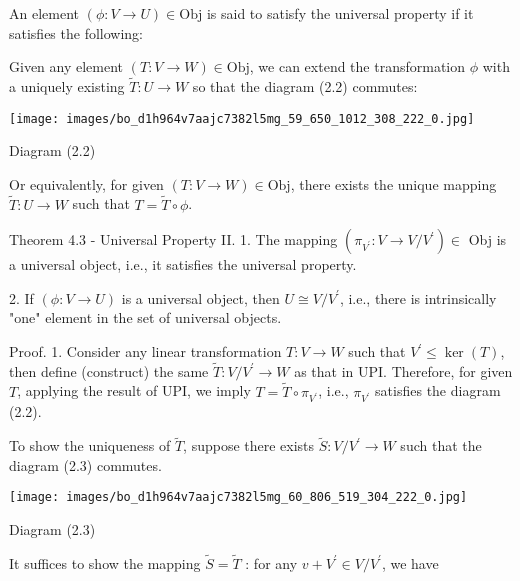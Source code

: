 \documentclass[11pt]{article}
\begin{document}
An element \(\left( {\phi  : V \rightarrow  U}\right)  \in  \mathrm{{Obj}}\) is said to satisfy the universal property if it satisfies the following:

Given any element \(\left( {T : V \rightarrow  W}\right)  \in  \mathrm{{Obj}}\), we can extend the transformation \(\phi\) with a uniquely existing \(\widetilde{T} : U \rightarrow  W\) so that the diagram (2.2) commutes:

\begin{center}
\texttt{[image: images/bo\_d1h964v7aajc7382l5mg\_59\_650\_1012\_308\_222\_0.jpg]}
\end{center}
\hspace*{3em} 

Diagram (2.2)

Or equivalently, for given \(\left( {T : V \rightarrow  W}\right)  \in  \mathrm{{Obj}}\), there exists the unique mapping \(\widetilde{T} : U \rightarrow  W\) such that \(T = \widetilde{T} \circ  \phi\).

Theorem 4.3 - Universal Property II. 1. The mapping \(\left( {{\pi }_{{V}^{\prime }} : V \rightarrow  V/{V}^{\prime }}\right)  \in\) Obj is a universal object, i.e., it satisfies the universal property.

2. If \(\left( {\phi  : V \rightarrow  U}\right)\) is a universal object, then \(U \cong  V/{V}^{\prime }\), i.e., there is intrinsically "one" element in the set of universal objects.

Proof. 1. Consider any linear transformation \(T : V \rightarrow  W\) such that \({V}^{\prime } \leq  \ker \left( T\right)\), then define (construct) the same \(\widetilde{T} : V/{V}^{\prime } \rightarrow  W\) as that in UPI. Therefore, for given \(T\), applying the result of UPI, we imply \(T = \widetilde{T} \circ  {\pi }_{{V}^{\prime }}\), i.e., \({\pi }_{{V}^{\prime }}\) satisfies the diagram (2.2).

To show the uniqueness of \(\widetilde{T}\), suppose there exists \(\widetilde{S} : V/{V}^{\prime } \rightarrow  W\) such that the diagram (2.3) commutes.

\begin{center}
\texttt{[image: images/bo\_d1h964v7aajc7382l5mg\_60\_806\_519\_304\_222\_0.jpg]}
\end{center}
\hspace*{3em} 

Diagram (2.3)

It suffices to show the mapping \(\widetilde{S} = \widetilde{T}\) : for any \(v + {V}^{\prime } \in  V/{V}^{\prime }\), we have
\end{document}
